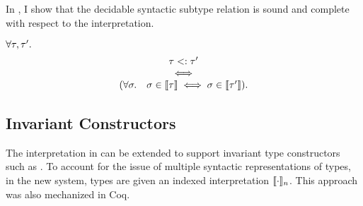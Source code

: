In \cite{bib:belyakova:minijl-sub:ftfjp:2019}, I show that the decidable 
syntactic subtype relation is sound and complete with respect
to the interpretation.

\begin{theorem}{}
    $\forall \tau, \tau'.$
    \[
        \begin{array}{c}
            \tau <: \tau' \\
            \iff \\
            (\forall \sigma.\quad \sigma \in \llbracket \tau \rrbracket \iff
                \sigma \in \llbracket \tau' \rrbracket).
        \end{array}
    \]
\end{theorem}

\subsection{Invariant Constructors}

The interpretation in  can be extended to support
invariant type constructors such as .
To account for the issue of multiple syntactic representations of types,
in the new system, types are given an indexed interpretation $\llbracket \cdot \rrbracket_n$.
This approach was also mechanized in Coq.

